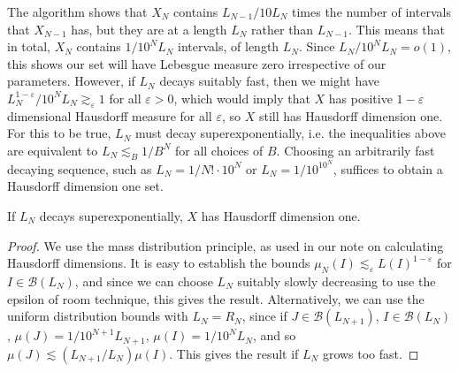 The algorithm shows that $X_N$ contains $L_{N-1} / 10 L_N$ times the number of intervals that $X_{N-1}$ has, but they are at a length $L_N$ rather than $L_{N-1}$. This means that in total, $X_N$ contains $1/10^N L_N$ intervals, of length $L_N$. Since $L_N / 10^N L_N = o(1)$, this shows our set will have Lebesgue measure zero irrespective of our parameters. However, if $L_N$ decays suitably fast, then we might have $L_N^{1 - \varepsilon}/10^N L_N \gtrsim_\varepsilon 1$ for all $\varepsilon > 0$, which would imply that $X$ has positive $1 - \varepsilon$ dimensional Hausdorff measure for all $\varepsilon$, so $X$ still has Hausdorff dimension one. For this to be true, $L_N$ must decay superexponentially, i.e. the inequalities above are equivalent to $L_N \lesssim_B 1/B^N$ for all choices of $B$. Choosing an arbitrarily fast decaying sequence, such as $L_N = 1/N! \cdot 10^N$ or $L_N = 1/10^{10^N}$, suffices to obtain a Hausdorff dimension one set.

\begin{lemma}
    If $L_N$ decays superexponentially, $X$ has Hausdorff dimension one.
\end{lemma}
\begin{proof}

We use the mass distribution principle, as used in our note on calculating Hausdorff dimensions. It is easy to establish the bounds $\mu_N(I) \lesssim_\varepsilon L(I)^{1-\varepsilon}$ for $I \in \mathcal{B}(L_N)$, and since we can choose $L_N$ suitably slowly decreasing to use the epsilon of room technique, this gives the result. Alternatively, we can use the uniform distribution bounds with $L_N = R_N$, since if $J \in \mathcal{B}(L_{N+1})$, $I \in \mathcal{B}(L_N)$, $\mu(J) = 1/10^{N+1} L_{N+1}$, $\mu(I) = 1/10^N L_N$, and so $\mu(J) \lesssim (L_{N+1}/L_N) \mu(I)$. This gives the result if $L_N$ grows too fast.
\end{proof}

